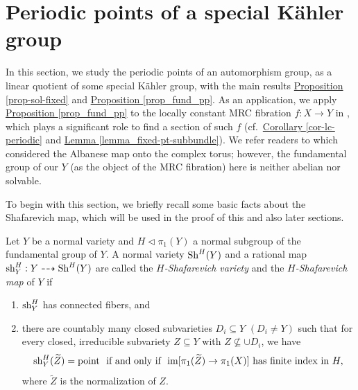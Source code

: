\section{Periodic points of a special K\"ahler group}\label{sec-period}
In this section, we study the periodic points of an automorphism group, as a linear quotient of some special K\"ahler group, with 
the main results {\hyperref[prop-sol-fixed]{Proposition    \ref*{prop-sol-fixed}}} and {\hyperref[prop_fund_pp]{Proposition     \ref*{prop_fund_pp}}}.
As an application, we apply {\hyperref[prop_fund_pp]{Proposition     \ref*{prop_fund_pp}}}  to the locally constant MRC fibration $f:X\to Y$ in \cite[Theorem 1.2]{MW21}, which plays a significant role to find a section of such $f$  (cf.~{\hyperref[cor-lc-periodic]{Corollary \ref*{cor-lc-periodic}}} and  {\hyperref[lemma_fixed-pt-subbundle]{Lemma   \ref*{lemma_fixed-pt-subbundle}}}). 
We refer readers to \cite[Section 4]{LOY19} which considered the Albanese map onto the complex torus; however, the fundamental group of our $Y$ (as the object of the MRC fibration) here is neither abelian nor solvable.



To begin with this section,  we briefly recall some basic facts about the Shafarevich map, which will be used in the proof of this and also later sections. 
\begin{defn}\label{defn-shafarevich}
Let $Y$ be a normal variety and $H\lhd \pi_1(Y)$ a normal subgroup of the fundamental group of $Y$.
A normal variety $\textup{Sh}^H(Y)$ and a rational map $\textup{sh}_Y^H:Y\dashrightarrow\textup{Sh}^H(Y)$ are called the \textit{$H$-Shafarevich variety} and the \textit{$H$-Shafarevich map} of $Y$ if
\begin{enumerate}
    \item[(1)] $\textup{sh}_Y^H$ has connected fibers, and
    \item[(2)] there are countably many closed subvarieties $D_i\subseteq Y$ $(D_i\neq Y)$ such that for every closed, irreducible subvariety $Z\subseteq Y$ with $Z\not\subseteq\cup D_i$, we have 
    $$\textup{sh}_Y^H(\widetilde{Z})=\textup{point}~~\textup{if and only if}~~\textup{im}[\pi_1(\widetilde{Z})\to\pi_1(X)]\textup{~has finite index in }H,$$
where $\widetilde{Z}$ is the normalization of $Z$.
\end{enumerate}
\end{defn}

